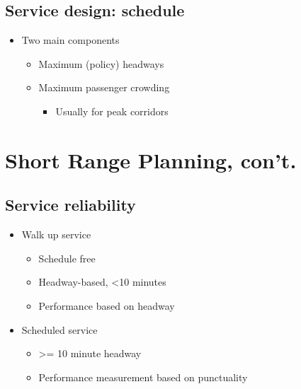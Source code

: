 \documentclass[11pt]{article}
\begin{document}
\subsection{Service design: schedule}
\label{sec:org2d1b8a9}
\begin{itemize}
\item Two main components
\begin{itemize}
\item Maximum (policy) headways
\item Maximum passenger crowding
\begin{itemize}
\item Usually for peak corridors
\end{itemize}
\end{itemize}
\end{itemize}

\section{Short Range Planning, con't.}
\label{sec:org9a0f396}

\subsection{Service reliability}
\label{sec:orgd00e5a1}
\begin{itemize}
\item Walk up service
\begin{itemize}
\item Schedule free
\item Headway-based, <10 minutes
\item Performance based on headway
\end{itemize}
\item Scheduled service
\begin{itemize}
\item >= 10 minute headway
\item Performance measurement based on punctuality
\end{itemize}
\end{itemize}
\end{document}
